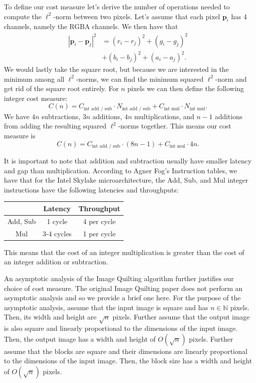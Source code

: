 \documentclass[letterpaper]{article}
\newcommand{\N}[0]{\mathbb{N}}
\begin{document}
To define our cost measure let's derive the number of operations needed to compute the $\ell ^2$-norm between two pixels. Let's assume that each pixel $\bm{p}_i$ has 4 channels, namely the RGBA channels. We then have that
\begin{align*}
  |\bm{p}_i - \bm{p}_j| ^2 & = (r_i - r_j)^2 + (g_i - g_j)^2 \\
  & + (b_i - b_j)^2 + (a_i - a_j)^2.
\end{align*}
We would lastly take the square root, but because we are interested in the minimum among all $\ell ^2$-norms, we can find the minimum squared $\ell ^2$-norm and get rid of the square root entirely. For $n$ pixels we can then define the following integer cost measure:
\[
  C(n) = C _\text{int add / sub} \cdot N _\text{int add / sub} + C_\text{int mul} \cdot N _\text{int mul}.
\]
We have $4n$ subtractions, $3n$ additions, $4n$ multiplications, and $n-1$ additions from adding the resulting squared $\ell ^2$-norms together. This means our cost measure is
\[
  C(n) = C _\text{int add / sub} \cdot (8n - 1) + C_\text{int mul} \cdot 4n.
\]

It is important to note that addition and subtraction usually have smaller latency and gap than multiplication. According to Agner Fog's Instruction tables, we have that for the Intel Skylake microarchitecture, the Add, Sub, and Mul integer instructions have the following latencies and throughputs:

\begin{center}
  \begin{tabular}{c|c|c}
    & Latency & Throughput \\
    \hline
    Add, Sub & 1 cycle & 4 per cycle \\
    \hline
    Mul & 3-4 cycles & 1 per cycle \\
  \end{tabular}
\end{center}

This means that the cost of an integer multiplication is greater than the cost of an integer addition or subtraction.

An asymptotic analysis of the Image Quilting algorithm further justifies our choice of cost measure. The original Image Quilting paper \cite{Efros:01} does not perform an asymptotic analysis and so we provide a brief one here. For the purpose of the asymptotic analysis, assume that the input image is square and has $n \in \N$ pixels. Then, its width and height are $\sqrt{n}$ pixels. Further assume that the output image is also square and linearly proportional to the dimensions of the input image. Then, the output image has a width and height of $O(\sqrt{n})$ pixels. Further assume that the blocks are square and their dimensions are linearly proportional to the dimensions of the input image. Then, the block size has a width and height of $O(\sqrt{n})$ pixels.
\end{document}
